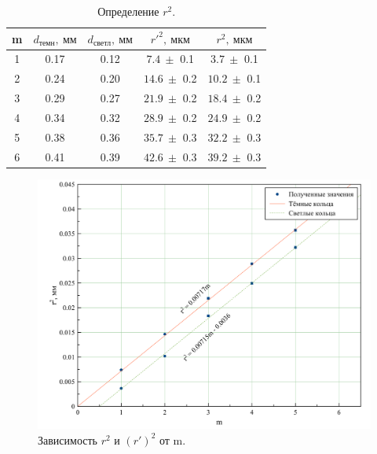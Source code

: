 \documentclass[a4paper, 12pt, twoside]{article}
\begin{document}
\begin{enumerate}
		\begin{table}[H]
			\centering
			\caption{Определение $r^2$.}
			\label{t3}
			\begin{tabular}{c|c|c|c|c} \toprule
				m & $d_\text{темн}, ~\text{мм}$ & $d_\text{светл}, ~\text{мм}$ & $r'^2,~\text{мкм}$ & $r^2,~\text{мкм}$ \\ \midrule
				1 & 0.17                        & 0.12                         & $7.4 ~\pm$ 0.1      & $3.7~ \pm$ 0.1     \\
				2 & 0.24                        & 0.20                         & $14.6~\pm$ 0.2      & $10.2 ~\pm$ 0.1    \\
				3 & 0.29                        & 0.27                         & $21.9 ~\pm$ 0.2     & $18.4 ~\pm$ 0.2    \\
				4 & 0.34                        & 0.32                         & $28.9~\pm$ 0.2      & $24.9 ~\pm$ 0.2    \\
				5 & 0.38                        & 0.36                         & $35.7 ~\pm$ 0.3     & $32.2 ~\pm $ 0.3   \\
				6 & 0.41                        & 0.39                         & $42.6~ \pm$ 0.3     & $39.2 ~\pm$ 0.3  \\ \bottomrule 
			\end{tabular}
		\end{table}
	
		\begin{figure}[H]
			\centering
			\includegraphics[width = \textwidth]{graph1}
			\caption{Зависимость $r^2$ и $(r')^2$ от m.}
			\label{graph1}
		\end{figure}
	

\end{enumerate}
\end{document}
